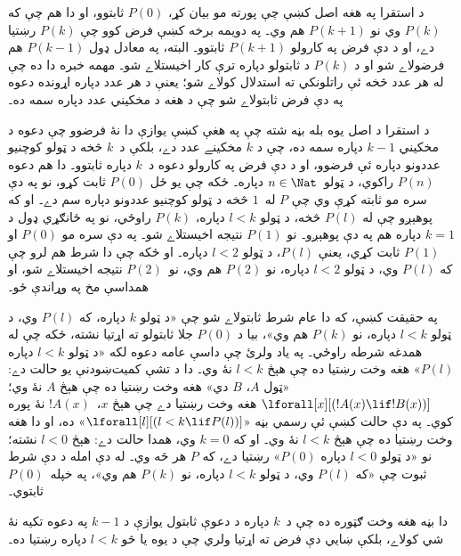 \documentclass[../../../include/open-logic-section]{subfiles}
\begin{document}


د استقرا په هغه اصل کښې چې پورته مو بيان کړ، $P(0)$
ثابتوو، او دا هم چې که $P(k)$ وي نو $P(k+1)$ هم وي۔ په
دويمه برخه کښې فرض کوو چې $P(k)$ رښتيا دے، او د دې
فرض په کارولو $P(k+1)$ ثابتوو۔ البته، په معادل ډول
$P(k-1)$ هم فرضولاے شو او د $P(k)$ د ثابتولو دپاره
ترې کار اخيستلاے شو۔ مهمه خبره دا ده چې له هر عدد
څخه ئې راتلونکي ته استدلال کولاے شو؛ يعنې د هر عدد
دپاره اړونده دعوه په دې فرض ثابتولاے شو چې د هغه د
مخکيني عدد دپاره سمه ده۔

د استقرا د اصل يوه بله بڼه شته چې په هغې کښې يوازې
دا نۀ فرضوو چې دعوه د مخکيني $k-1$ دپاره سمه
ده، چې د $k$ مخکينے عدد دے، بلکې د~$k$ څخه د ټولو کوچنيو عددونو دپاره ئې
فرضوو، او د دې فرض په کارولو دعوه د~$k$ دپاره
ثابتوو۔ دا هم دعوه $P(n)$ راکوي، د ټولو~$n \in
\Nat$ دپاره۔ ځکه چې يو ځل $P(0)$
ثابت کړو، نو په دې سره مو ثابته کړې وي چې $P$ له~$1$
څخه د ټولو کوچنيو عددونو دپاره سم دے۔ او که پوهېږو
چې له $P(l)$ څخه، د ټولو $l<k$ دپاره، $P(k)$ راوځي، نو
په ځانګړي ډول د $k=1$ دپاره هم په دې پوهېږو۔ نو
$P(1)$ نتيجه اخيستلاے شو۔ په دې سره مو $P(0)$ او
$P(1)$ ثابت کړي، يعنې $P(l)$، د ټولو $l<2$ دپاره۔ او
ځکه چې دا شرط هم لرو چې که $P(l)$ وي، د ټولو $l<2$ دپاره،
نو $P(2)$ هم وي، نو~$P(2)$ نتيجه اخيستلاے شو، او
همداسې مخ په وړاندې ځو۔

په حقيقت کښې، که دا عام شرط ثابتولاے شو چې «د ټولو
$k$ دپاره، که $P(l)$ وي، د ټولو $l<k$ دپاره، نو $P(k)$
هم وي»، بيا د $P(0)$ جلا ثابتولو ته اړتيا نشته، ځکه
چې له همدغه شرطه راوځي۔ په ياد ولرئ چې داسې عامه
دعوه لکه «د ټولو $l<k$ دپاره $P(l)$» هغه وخت رښتيا
ده چې هېڅ $l<k$ نۀ وي۔ دا د تشې کميت‌ښودنې يو حالت
دے: «ټول $A$، $B$ دي» هغه وخت رښتيا ده چې هېڅ $A$
نۀ وي؛ $\lforall[x][(!A(x) \lif !B(x))]$ هغه وخت
رښتيا دے چې هېڅ $x$،~$!A(x)$ نۀ پوره کوي۔ په دې
حالت کښې ئې رسمي بڼه «$\lforall[l][(l < k \lif P(l))]$»
ده، او دا هغه وخت رښتيا ده چې هېڅ $l < k$ نۀ وي۔
او که $k=0$ وي، همدا حالت دے: هېڅ $l<0$ نشته؛ نو
«د ټولو $l<0$ دپاره $P(0)$» رښتيا دے، که $P$ هر
څه وي۔ له دې امله د دې شرط ثبوت چې «که $P(l)$ وي، د ټولو
$l<k$ دپاره، نو $P(k)$ هم وي»، په خپله~$P(0)$
ثابتوي۔

دا بڼه هغه وخت ګټوره ده چې د~$k$ دپاره د دعوې
ثابتول يوازې د $k-1$ په دعوه تکيه نۀ شي کولاے،
بلکې ښايي دې فرض ته اړتيا ولري چې د يوه يا څو
$l<k$ دپاره رښتيا ده۔
\end{document}
